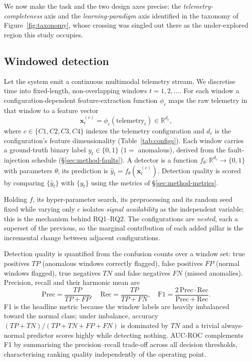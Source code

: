 \documentclass[pdflatex,sn-mathphys-num]{sn-jnl}%
\theoremstyle{thmstyleone}%
\theoremstyle{thmstyletwo}%
\theoremstyle{thmstylethree}%
\begin{document}
We now make the task and the two design axes precise: the \emph{telemetry-completeness} axis and the \emph{learning-paradigm} axis identified in the taxonomy of Figure~\ref{fig:taxonomy}, whose crossing was singled out there as the under-explored region this study occupies.

\subsection{Windowed detection}\label{sec:prob-detect}

Let the system emit a continuous multimodal telemetry stream. We discretise time into fixed-length, non-overlapping windows $t = 1, 2, \dots$. For each window a configuration-dependent feature-extraction function $\phi_c$ maps the raw telemetry in that window to a feature vector
\begin{equation}
  \mathbf{x}_t^{(c)} = \phi_c(\text{telemetry}_t) \in \mathbb{R}^{d_c},
\end{equation}
where $c \in \{C1, C2, C3, C4\}$ indexes the telemetry configuration and $d_c$ is the configuration's feature dimensionality (Table~\ref{tab:configs}). Each window carries a ground-truth binary label $y_t \in \{0,1\}$ ($1 =$ anomalous), derived from the fault-injection schedule (\S\ref{sec:method-faults}). A detector is a function $f_\theta : \mathbb{R}^{d_c} \to \{0,1\}$ with parameters $\theta$; its prediction is $\hat{y}_t = f_\theta(\mathbf{x}_t^{(c)})$. Detection quality is scored by comparing $\{\hat{y}_t\}$ with $\{y_t\}$ using the metrics of \S\ref{sec:method-metrics}.

Holding $f$, its hyper-parameter search, its preprocessing and its random seed fixed while varying only $c$ isolates \emph{signal availability} as the independent variable; this is the mechanism behind RQ1--RQ2. The configurations are \emph{nested}, each a superset of the previous, so the marginal contribution of each added pillar is the incremental change between adjacent configurations.

Detection quality is quantified from the confusion counts over a window set: true positives $TP$ (anomalous windows correctly flagged), false positives $FP$ (normal windows flagged), true negatives $TN$ and false negatives $FN$ (missed anomalies). Precision, recall and their harmonic mean are
\begin{equation}
  \mathrm{Prec} = \frac{TP}{TP+FP}, \quad
  \mathrm{Rec} = \frac{TP}{TP+FN}, \quad
  \mathrm{F1} = \frac{2\,\mathrm{Prec}\cdot\mathrm{Rec}}{\mathrm{Prec}+\mathrm{Rec}}.
\end{equation}
F1 is the headline metric because the window labels are heavily imbalanced toward the normal class; under imbalance, accuracy $(TP{+}TN)/(TP{+}TN{+}FP{+}FN)$ is dominated by $TN$ and a trivial always-normal predictor scores highly while detecting nothing. AUC-ROC complements F1 by summarising the precision--recall trade-off across all decision thresholds, characterising ranking quality independently of the operating point.
\end{document}
